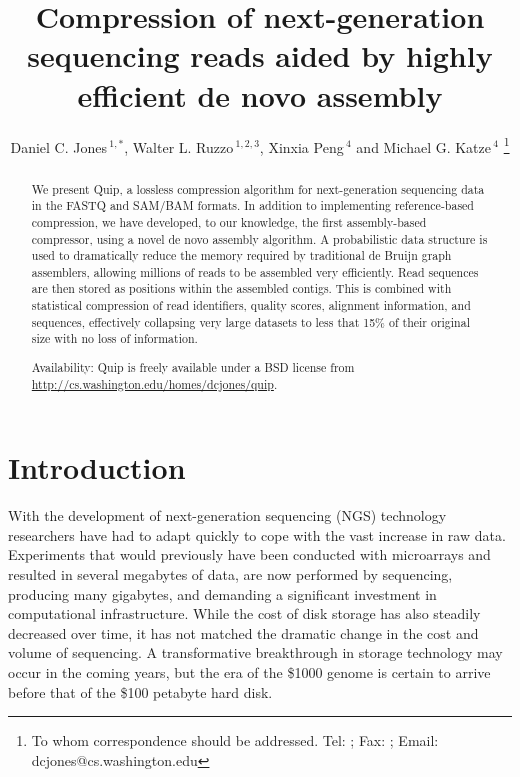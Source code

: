 \documentclass[a4,center,fleqn]{NAR}
\begin{document}
\title{Compression of next-generation sequencing reads aided by highly efficient de novo assembly}

\author{%
Daniel C. Jones\,$^{1,*}$,
Walter L. Ruzzo\,$^{1,2,3}$,
Xinxia Peng\,$^{4}$
and Michael G. Katze\,$^{4}$%
\footnote{To whom correspondence should be addressed.
Tel: ; Fax: ; Email: dcjones@cs.washington.edu}}

\address{
$^{1}$Department of Computer Science and Engineering,
University of Washington, Seattle, WA 98195-2350, USA
$^{2}$Department of Genome Sciences, University of Washington, Seattle, WA
98195-5065, USA
$^{3}$Fred Hutchinson Cancer Research Center, Seattle, WA 98109, USA
$^{4}$Department of Microbiology, University of Washington, Seattle, WA
98195-7242, USA
}

\history{}

\maketitle

\begin{abstract}
We present Quip, a lossless compression algorithm for next-generation
sequencing data in the FASTQ and SAM/BAM formats. In addition to implementing
reference-based compression, we have developed, to our knowledge, the first
assembly-based compressor, using a novel de novo assembly algorithm. A
probabilistic data structure is used to dramatically reduce the memory
required by traditional de Bruijn graph assemblers, allowing millions of reads
to be assembled very efficiently. Read sequences are then stored as positions
within the assembled contigs. This is combined with statistical compression of
read identifiers, quality scores, alignment information, and sequences,
effectively collapsing very large datasets to less that 15\% of their original
size with no loss of information.

Availability: Quip is freely available under a BSD license from
\url{http://cs.washington.edu/homes/dcjones/quip}.
\end{abstract}

\section{Introduction}

With the development of next-generation sequencing (NGS) technology
researchers have had to adapt quickly to cope with the vast increase in raw
data. Experiments that would previously have been conducted with microarrays
and resulted in several megabytes of data, are now performed by sequencing,
producing many gigabytes, and demanding a significant investment in
computational infrastructure. While the cost of disk storage has also steadily
decreased over time, it has not matched the dramatic change in the cost and
volume of sequencing. A transformative breakthrough in storage technology may
occur in the coming years, but the era of the \$1000 genome is certain to
arrive before that of the \$100 petabyte hard disk.
\end{document}
